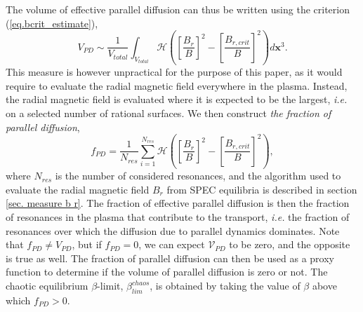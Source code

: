 \documentclass[my_thesis.tex]{subfiles}
\begin{document}
The volume of effective parallel diffusion can thus be written using the criterion (\ref{eq.bcrit_estimate}),
\begin{equation}
	V_{PD} \sim \frac{1}{V_{total}} \int_{V_{total}}\mathcal{H}\left(\left[\frac{ B_{r}}{B}\right]^2-\left[\frac{ B_{r,crit}}{B}\right]^2\right) d\mathbf{x}^3.
\end{equation}
This measure is however unpractical for the purpose of this paper, as it would require to evaluate the radial magnetic field everywhere in the plasma. Instead, the radial magnetic field is evaluated where it is expected to be the largest, \textit{i.e.} on a selected number of rational surfaces. We then construct \emph{the fraction of parallel diffusion},
\begin{equation}
	f_{PD} = \frac{1}{N_{res}}\sum_{i=1}^{N_{res}} \mathcal{H}\left(\left[\frac{B_{r}}{B}\right]^2-\left[\frac{B_{r,crit}}{B}\right]^2\right), \label{eq.def metric}
\end{equation}
where $N_{res}$ is the number of considered resonances, and the algorithm used to evaluate the radial magnetic field $B_r$ from SPEC equilibria is described in section \ref{sec. measure b r}. The fraction of effective parallel diffusion is then the fraction of resonances in the plasma that contribute to the transport, \textit{i.e.} the fraction of resonances over which the diffusion due to parallel dynamics dominates. Note that $f_{PD}\neq V_{PD}$, but if $f_{PD}=0$, we can expect $\mathcal{V}_{PD}$ to be zero, and the opposite is true as well. The fraction of parallel diffusion can then be used as a proxy function to determine if the volume of parallel diffusion is zero or not. The chaotic equilibrium $\beta$-limit, $\beta^{chaos}_{lim}$, is obtained by taking the value of $\beta$ above which $f_{PD}>0$. 


\end{document}
